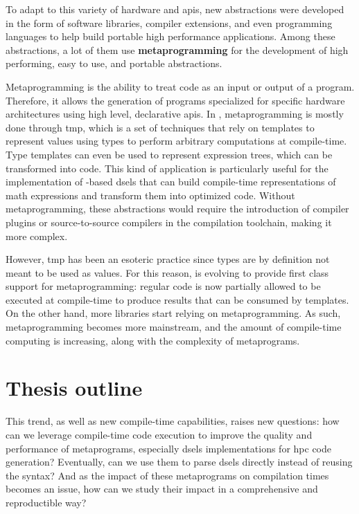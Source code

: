 \documentclass[main]{subfiles}
\begin{document}
To adapt to this variety of hardware and \glspl{api}, new abstractions
were developed in the form of software libraries, compiler extensions,
and even programming languages to help build portable high performance
applications.
Among these abstractions, a lot of them use \textbf{metaprogramming} for the
development of high performing, easy to use, and portable abstractions.

Metaprogramming is the ability to treat code as an input or output of a program.
Therefore, it allows the generation of programs specialized for
specific hardware architectures using high level, declarative \glspl{api}.
In \cpp, metaprogramming is mostly done through \gls{tmp}, which is a set of
techniques that rely on \cpp templates to represent values using types to
perform arbitrary computations at compile-time.
Type templates can even be used to represent expression trees,
which can be transformed into code. This kind of application is particularly
useful for the implementation of \cpp-based \glspl{dsel} that can build
compile-time representations of math expressions and transform them into
optimized code. Without metaprogramming, these abstractions would require
the introduction of compiler plugins or source-to-source compilers in the
compilation toolchain, making it more complex.

However, \gls{tmp} has been an esoteric practice since types are by definition
not meant to be used as values. For this reason, \cpp is evolving to provide
first class support for metaprogramming: regular \cpp code is now partially
allowed to be executed at compile-time to produce results that can be consumed
by templates. On the other hand, more \cpp libraries start relying on \cpp
metaprogramming. As such, \cpp metaprogramming becomes more mainstream,
and the amount of compile-time computing is increasing, along with
the complexity of \cpp metaprograms.
\\


\section{
  Thesis outline
}

This trend, as well as new \cpp compile-time capabilities, raises new questions:
how can we leverage compile-time \cpp code execution to improve the quality
and performance of \cpp metaprograms, especially \glspl{dsel} implementations
for \acrlong{hpc} code generation? Eventually, can we use them to parse
\glspl{dsel} directly instead of reusing the \cpp syntax?
And as the impact of these metaprograms on compilation times becomes an issue,
how can we study their impact in a comprehensive and reproductible way?
\\
\end{document}
